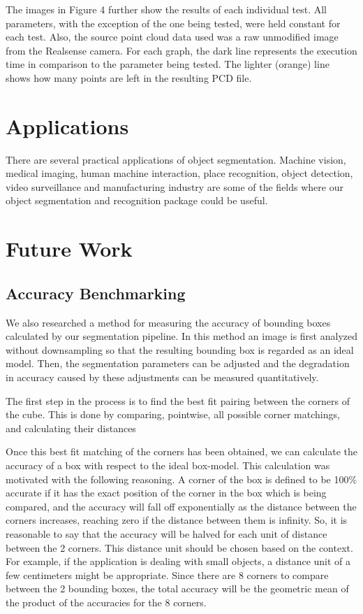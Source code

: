 \documentclass[journal]{IEEEtran}
\begin{document}
The images in Figure 4 further show the results of each individual test.  All parameters, with the exception of the one being tested, were held constant for each test.  Also, the source point cloud data used was a raw unmodified image from the Realsense camera.  For each graph, the dark line represents the execution time in comparison to the parameter being tested.  The lighter (orange) line shows how many points are left in the resulting PCD file.

\section{Applications}
There are several practical applications of object segmentation. Machine vision, medical imaging, human machine interaction, place recognition, object detection, video surveillance and manufacturing industry are some of the fields where our object segmentation and recognition package could be useful.
\section{Future Work}
\subsection{Accuracy Benchmarking}
We also researched a method for measuring the accuracy of bounding boxes calculated by our segmentation pipeline.  In this method an image is first analyzed without downsampling so that the resulting bounding box is regarded as an ideal model. Then, the segmentation parameters can be adjusted and the degradation in accuracy caused by these adjustments can be measured quantitatively.

The first step in the process is to find the best fit pairing between the corners of the cube.  This is done by comparing, pointwise, all possible corner matchings, and calculating their distances 

Once this best fit matching of the corners has been obtained, we can calculate the accuracy of a box with respect to the ideal box-model.  This calculation was motivated with the following reasoning. A corner of the box is defined to be 100\% accurate if it has the exact position of the corner in the box which is being compared, and the accuracy will fall off exponentially as the distance between the corners increases, reaching zero if the distance between them is infinity.  So, it is reasonable to say that the accuracy will be halved for each unit of distance between the 2 corners.  This distance unit should be chosen based on the context.  For example, if the application is dealing with small objects, a distance unit of a few centimeters might be appropriate.  Since there are 8 corners to compare between the 2 bounding boxes, the total accuracy will be the geometric mean of the product of the accuracies for the 8 corners.  
\end{document}

